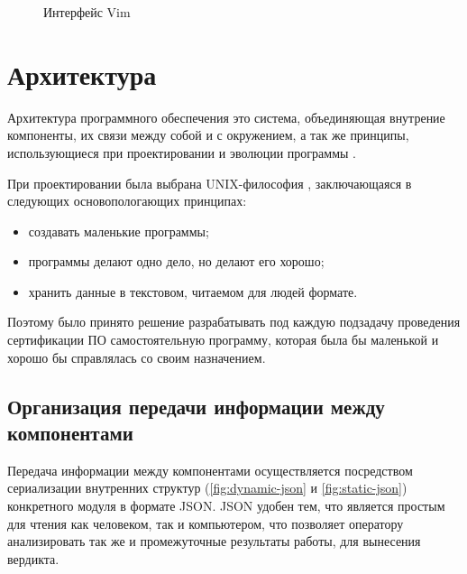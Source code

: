 \begin{figure}[!htbp]
    \caption{Интерфейс Vim {\ProgModule}\label{fig:vim-tui}}
\end{figure}

\section{Архитектура {\ProgModule}}\label{sec:ch2/sec2}
Архитектура программного обеспечения это система, объединяющая внутрение
компоненты, их связи между собой и с окружением, а так же принципы,
использующиеся при проектировании и эволюции программы \autocite{software-architecture}.

При проектировании {\ProgModule} была выбрана UNIX-философия \autocite{unix-philosophy},
заключающаяся в следующих основопологающих принципах:
\begin{itemize}
    \item создавать маленькие программы;
    \item программы делают одно дело, но делают его хорошо;
    \item хранить данные в текстовом, читаемом для людей формате.
\end{itemize}

Поэтому было принято решение разрабатывать под каждую подзадачу проведения сертификации ПО
самостоятельную программу, которая была бы маленькой и хорошо бы справлялась со своим назначением.

\subsection{Организация передачи информации между компонентами {\ProgModule}}\label{sec:ch2/sec2/sub1}
Передача информации между компонентами {\ProgModule} осуществляется посредством
сериализации внутренних структур (\autoref{fig:dynamic-json} и \autoref{fig:static-json})
конкретного модуля в формате JSON. JSON удобен тем, что является простым для 
чтения как человеком, так и компьютером, что позволяет оператору 
анализировать так же и промежуточные результаты работы, для
вынесения вердикта.

